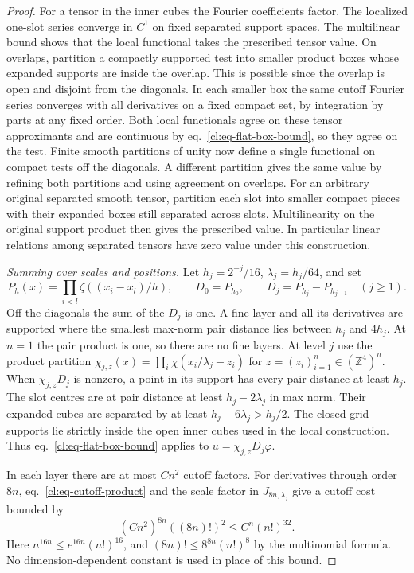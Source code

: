\documentclass[11pt,letterpaper,reqno]{amsart}
\numberwithin{equation}{section}
\renewcommand{\eqref}[1]{\textup{eq.~\ref{#1}}}
\theoremstyle{definition}
\theoremstyle{remark}
\begin{document}
\begin{proof}
For a tensor in the inner cubes the Fourier coefficients factor.
The localized one-slot series converge in \(C^1\) on fixed
separated support spaces. The multilinear bound shows that
the local functional takes the prescribed tensor value.
On overlaps, partition a compactly supported test into smaller
product boxes whose expanded supports are inside the overlap.
This is possible since the overlap is open and disjoint from
the diagonals. In each smaller box the same cutoff Fourier
series converges with all derivatives on a fixed compact set,
by integration by parts at any fixed order. Both local
functionals agree on these tensor approximants and are continuous
by \eqref{cl:eq-flat-box-bound}, so they agree on the test.
Finite smooth partitions of unity now define a single functional
on compact tests off the diagonals. A different partition gives
the same value by refining both partitions and using agreement
on overlaps. For an arbitrary original separated smooth tensor,
partition each slot into smaller compact pieces with their
expanded boxes still separated across slots. Multilinearity on
the original support product then gives the prescribed value.
In particular linear relations among separated tensors have
zero value under this construction.

\emph{Summing over scales and positions.}
Let \(h_j=2^{-j}/16\), \(\lambda_j=h_j/64\), and set
\[
 P_h(x)=\prod_{i<l}\zeta((x_i-x_l)/h),\qquad
 D_0=P_{h_0},\qquad D_j=P_{h_j}-P_{h_{j-1}}\quad(j\ge1).
\]
Off the diagonals the sum of the \(D_j\) is one. A fine layer
and all its derivatives are supported where the smallest
max-norm pair distance lies between \(h_j\) and \(4h_j\).
At \(n=1\) the pair product is one, so there are no fine layers.
At level \(j\) use the product partition
\(\chi_{j,z}(x)=\prod_i\chi(x_i/\lambda_j-z_i)\) for
\(z=(z_i)_{i=1}^n\in(\mathbb Z^4)^n\).
When \(\chi_{j,z}D_j\) is nonzero, a point in its support
has every pair distance at least \(h_j\). The slot centres
are at pair distance at least \(h_j-2\lambda_j\) in max norm.
Their expanded cubes are separated by at least
\(h_j-6\lambda_j>h_j/2\).
The closed grid supports lie strictly inside the open inner
cubes used in the local construction.
Thus \eqref{cl:eq-flat-box-bound} applies to
\(u=\chi_{j,z}D_j\varphi\).

In each layer there are at most \(C n^2\) cutoff factors.
For derivatives through order \(8n\), \eqref{cl:eq-cutoff-product}
and the scale factor in \(J_{8n,\lambda_j}\) give a cutoff cost
bounded by
\begin{equation}\label{cl:eq-factorial-accounting}
 (Cn^2)^{8n}((8n)!)^2 \le C^n(n!)^{32}.
\end{equation}
Here \(n^{16n}\le e^{16n}(n!)^{16}\), and
\((8n)!\le8^{8n}(n!)^8\) by the multinomial formula.
No dimension-dependent constant is used in place of this bound.


\end{proof}
\end{document}
